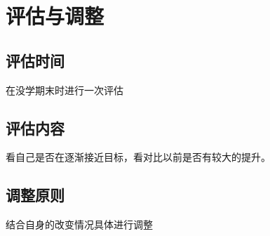 \documentclass{article}
\begin{document}
\section{评估与调整}

\subsection{评估时间}
在没学期末时进行一次评估\par
\subsection{评估内容}
看自己是否在逐渐接近目标，看对比以前是否有较大的提升。\par
\subsection{调整原则}
结合自身的改变情况具体进行调整\par
\end{document}
